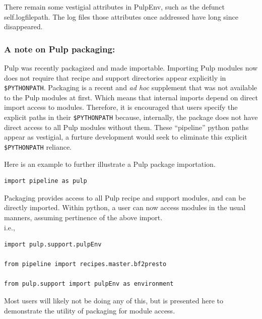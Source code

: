 \documentclass[a4paper,10pt,bibtotoc]{scrartcl}
\begin{document}
There remain some vestigial attributes in PulpEnv, such as the defunct self.logfilepath.
The log files those attributes once addressed have long since disappeared.

\subsubsection{A note on Pulp packaging:}
Pulp was recently packagized and made importable.  Importing Pulp
modules now does not require that recipe and support directories appear explicitly in \verb|$PYTHONPATH|.   Packaging is a recent and \emph{ad hoc} supplement  that was not available to the Pulp modules at first.  Which means that internal imports depend on direct import access to modules.  Therefore, it is encouraged that users specify the explicit paths in their  \verb|$PYTHONPATH| because, internally, the package does not have direct access to all Pulp modules without them.  These ``pipeline'' python paths appear as vestigial, a furture development would seek to eliminate this explicit \verb|$PYTHONPATH| reliance. 

Here is an example to further illustrate a Pulp package importation.

\begin{verbatim}
import pipeline as pulp
\end{verbatim}

Packaging provides access to all Pulp recipe and support modules, and can be directly imported.   Within python, a user can now access modules in the usual manners, assuming pertinence of the above import.\\
 i.e.,
\begin{verbatim}
import pulp.support.pulpEnv

from pipeline import recipes.master.bf2presto

from pulp.support import pulpEnv as environment
\end{verbatim}
Most users will likely not be doing any of this, but is presented here to demonstrate the utility of packaging for module access. 
\end{document}
